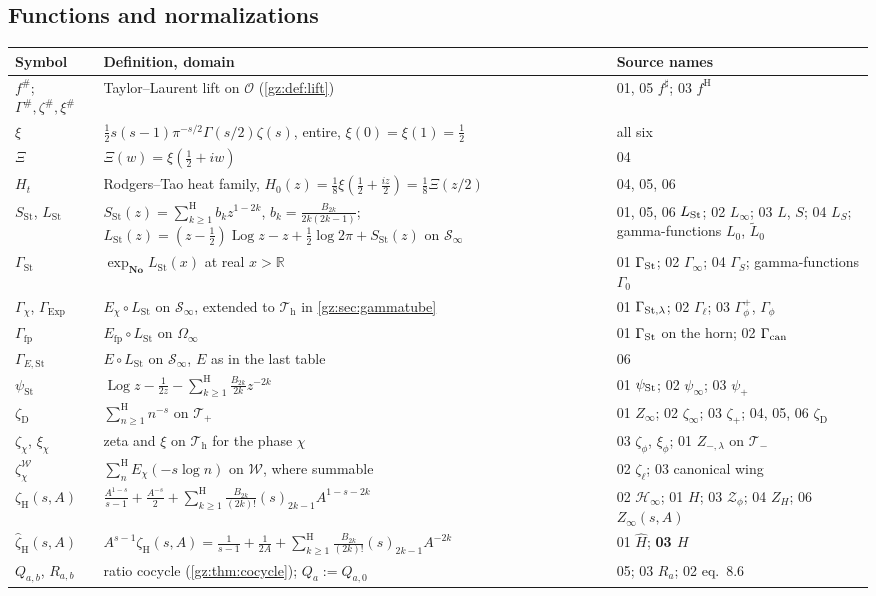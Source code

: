 \documentclass[11pt,a4paper]{article}
\numberwithin{equation}{section}
\theoremstyle{definition}
\theoremstyle{remark}
\newcommand{\No}{\mathbf{No}}
\newcommand{\R}{\mathbb R}
\newcommand{\OO}{\mathcal O}
\newcommand{\Log}{\operatorname{Log}}
\newcommand{\Exp}{\operatorname{Exp}}
\newcommand{\Efp}{E_{\mathrm{fp}}}
\newcommand{\Sh}{\mathop{\textstyle\sum}\nolimits^{\mathrm H}}
\newcommand{\LSt}{L_{\mathrm{St}}}
\newcommand{\GSt}{\Gamma_{\mathrm{St}}}
\newcommand{\SSt}{S_{\mathrm{St}}}
\newcommand{\psiSt}{\psi_{\mathrm{St}}}
\newcommand{\zD}{\zeta_{\mathrm D}}
\newcommand{\zH}{\zeta_{\mathrm H}}
\newcommand{\zHh}{\widehat\zeta_{\mathrm H}}
\newcommand{\Gp}{\Gamma^{\#}}
\newcommand{\zp}{\zeta^{\#}}
\newcommand{\xip}{\xi^{\#}}
\newcommand{\Tp}{\mathcal T_{+}}
\newcommand{\Tm}{\mathcal T_{-}}
\newcommand{\Th}{\mathcal T_{\mathrm h}}
\newcommand{\Wing}{\mathcal W}
\newcommand{\Sinf}{\mathcal S_{\infty}}
\newcommand{\Om}{\Omega_{\infty}}
\begin{document}
\subsection{Functions and normalizations}\label{gz:sec:fnconv}
\begin{center}\small
\begin{longtable}{@{}P{0.20\textwidth}P{0.42\textwidth}P{0.30\textwidth}@{}}
\toprule
Symbol & Definition, domain & Source names\\
\midrule
\endhead
$f^\#$; $\Gp,\zp,\xip$ & Taylor--Laurent lift on $\OO$ (\cref{gz:def:lift}) & 01, 05 $f^\sharp$; 03 $f^{\mathrm H}$\\
$\xi$ & $\tfrac12s(s-1)\pi^{-s/2}\Gamma(s/2)\zeta(s)$, entire, $\xi(0)=\xi(1)=\tfrac12$ & all six\\
$\Xi$ & $\Xi(w)=\xi(\tfrac12+iw)$ & 04\\
$H_t$ & Rodgers--Tao heat family, $H_0(z)=\tfrac18\xi(\tfrac12+\tfrac{iz}2)=\tfrac18\Xi(z/2)$ & 04, 05, 06\\
$\SSt$, $\LSt$ & $\SSt(z)=\Sh_{k\ge1}b_kz^{1-2k}$, $b_k=\frac{B_{2k}}{2k(2k-1)}$; $\LSt(z)=(z-\tfrac12)\Log z-z+\tfrac12\log2\pi+\SSt(z)$ on $\Sinf$ & 01, 05, 06 $L_{\rm St}$; 02 $L_\infty$; 03 $L$, $S$; 04 $L_S$; gamma-functions $L_0$, $\widetilde L_0$\\
$\GSt$ & $\exp_{\No}\LSt(x)$ at real $x>\R$ & 01 $\Gamma_{\rm St}$; 02 $\Gamma_\infty$; 04 $\Gamma_S$; gamma-functions $\Gamma_0$\\
$\Gamma_\chi$, $\Gamma_{\Exp}$ & $E_\chi\circ\LSt$ on $\Sinf$, extended to $\Th$ in \cref{gz:sec:gammatube} & 01 $\Gamma_{{\rm St},\lambda}$; 02 $\Gamma_\ell$; 03 $\Gamma^+_\phi$, $\Gamma_\phi$\\
$\Gamma_{\mathrm{fp}}$ & $\Efp\circ\LSt$ on $\Om$ & 01 $\Gamma_{\rm St}$ on the horn; 02 $\Gamma_{\rm can}$\\
$\Gamma_{E,\mathrm{St}}$ & $E\circ\LSt$ on $\Sinf$, $E$ as in the last table & 06\\
$\psiSt$ & $\Log z-\frac1{2z}-\Sh_{k\ge1}\frac{B_{2k}}{2k}z^{-2k}$ & 01 $\psi_{\rm St}$; 02 $\psi_\infty$; 03 $\psi_+$\\
$\zD$ & $\Sh_{n\ge1}n^{-s}$ on $\Tp$ & 01 $Z_\infty$; 02 $\zeta_\infty$; 03 $\zeta_+$; 04, 05, 06 $\zeta_{\mathrm D}$\\
$\zeta_\chi$, $\xi_\chi$ & zeta and $\xi$ on $\Th$ for the phase $\chi$ & 03 $\zeta_\phi$, $\xi_\phi$; 01 $Z_{-,\lambda}$ on $\Tm$\\
$\zeta^{\Wing}_\chi$ & $\Sh_nE_\chi(-s\log n)$ on $\Wing$, where summable & 02 $\zeta_\ell$; 03 canonical wing\\
$\zH(s,A)$ & $\frac{A^{1-s}}{s-1}+\frac{A^{-s}}2+\Sh_{k\ge1}\frac{B_{2k}}{(2k)!}(s)_{2k-1}A^{1-s-2k}$ & 02 $\mathcal H_\infty$; 01 $H$; 03 $\mathcal Z_\phi$; 04 $Z_H$; 06 $Z_\infty(s,A)$\\
$\zHh(s,A)$ & $A^{s-1}\zH(s,A)=\frac1{s-1}+\frac1{2A}+\Sh_{k\ge1}\frac{B_{2k}}{(2k)!}(s)_{2k-1}A^{-2k}$ & 01 $\widehat H$; \textbf{03 $H$}\\
$Q_{a,b}$, $R_{a,b}$ & ratio cocycle (\cref{gz:thm:cocycle}); $Q_a:=Q_{a,0}$ & 05; 03 $R_a$; 02 eq.\ 8.6\\
\bottomrule
\end{longtable}
\addtocounter{table}{-1}
\end{center}
\end{document}
